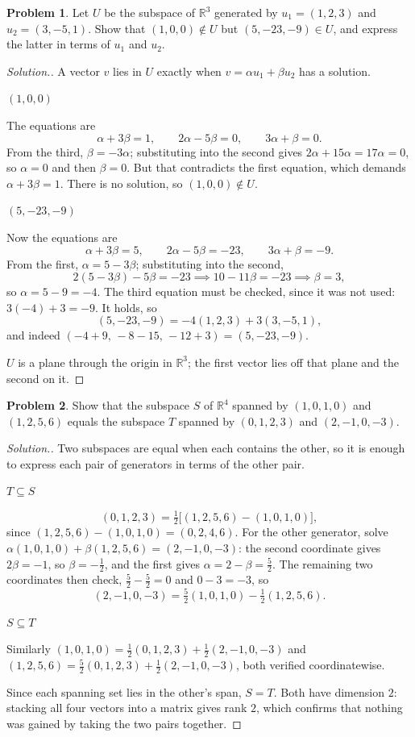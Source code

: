 \documentclass[11pt,a4paper]{article}
\theoremstyle{definition}
\newtheorem{problemx}{Problem}[section]
\newenvironment{problem}{\begin{problemx}}{\end{problemx}}
\newenvironment{solution}
  {\renewcommand{\qedsymbol}{}\begin{proof}[\textit{Solution}.]}
  {\end{proof}}
\newcommand{\subhead}[1]{%
  \par\medskip\noindent\textbf{#1}\par\nobreak\smallskip}
\begin{document}
\begin{problem}
Let $U$ be the subspace of $\mathbb{R}^3$ generated by $u_1=(1,2,3)$ and
$u_2=(3,-5,1)$. Show that $(1,0,0)\notin U$ but $(5,-23,-9)\in U$, and express
the latter in terms of $u_1$ and $u_2$.
\end{problem}
\begin{solution}
A vector $v$ lies in $U$ exactly when $v=\alpha u_1+\beta u_2$ has a solution.

\subhead{$(1,0,0)$}
The equations are
$$\alpha+3\beta=1,\qquad 2\alpha-5\beta=0,\qquad 3\alpha+\beta=0.$$
From the third, $\beta=-3\alpha$; substituting into the second gives
$2\alpha+15\alpha=17\alpha=0$, so $\alpha=0$ and then $\beta=0$. But that
contradicts the first equation, which demands $\alpha+3\beta=1$. There is no
solution, so $(1,0,0)\notin U$.

\subhead{$(5,-23,-9)$}
Now the equations are
$$\alpha+3\beta=5,\qquad 2\alpha-5\beta=-23,\qquad 3\alpha+\beta=-9.$$
From the first, $\alpha=5-3\beta$; substituting into the second,
$$2(5-3\beta)-5\beta=-23\implies 10-11\beta=-23\implies \beta=3,$$
so $\alpha=5-9=-4$. The third equation must be checked, since it was not used:
$3(-4)+3=-9$. It holds, so
$$(5,-23,-9)=-4(1,2,3)+3(3,-5,1),$$
and indeed $(-4+9,\,-8-15,\,-12+3)=(5,-23,-9)$.

$U$ is a plane through the origin in $\mathbb{R}^3$; the first vector lies off
that plane and the second on it.
\end{solution}

\begin{problem}
Show that the subspace $S$ of $\mathbb{R}^4$ spanned by $(1,0,1,0)$ and
$(1,2,5,6)$ equals the subspace $T$ spanned by $(0,1,2,3)$ and $(2,-1,0,-3)$.
\end{problem}
\begin{solution}
Two subspaces are equal when each contains the other, so it is enough to
express each pair of generators in terms of the other pair.

\subhead{$T\subseteq S$}
$$(0,1,2,3)=\tfrac{1}{2}\big[(1,2,5,6)-(1,0,1,0)\big],$$
since $(1,2,5,6)-(1,0,1,0)=(0,2,4,6)$. For the other generator, solve
$\alpha(1,0,1,0)+\beta(1,2,5,6)=(2,-1,0,-3)$: the second coordinate gives
$2\beta=-1$, so $\beta=-\frac12$, and the first gives
$\alpha=2-\beta=\frac{5}{2}$. The remaining two coordinates then check,
$\frac52-\frac52=0$ and $0-3=-3$, so
$$(2,-1,0,-3)=\tfrac{5}{2}(1,0,1,0)-\tfrac{1}{2}(1,2,5,6).$$

\subhead{$S\subseteq T$}
Similarly $(1,0,1,0)=\frac{1}{2}(0,1,2,3)+\frac{1}{2}(2,-1,0,-3)$ and
$(1,2,5,6)=\frac{5}{2}(0,1,2,3)+\frac{1}{2}(2,-1,0,-3)$, both verified
coordinatewise.

Since each spanning set lies in the other's span, $S=T$. Both have dimension
$2$: stacking all four vectors into a matrix gives rank $2$, which confirms
that nothing was gained by taking the two pairs together.
\end{solution}
\end{document}
